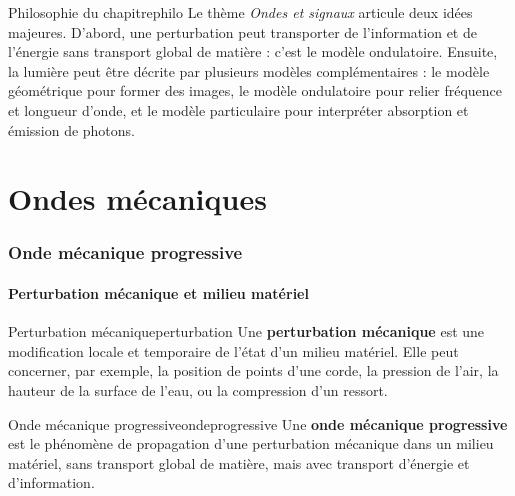 \documentclass[11pt,a4paper]{article}
\begin{document}
\begin{remarquebox}{Philosophie du chapitre}{philo}
Le thème \emph{Ondes et signaux} articule deux idées majeures. D'abord, une perturbation peut transporter de l'information et de l'énergie sans transport global de matière : c'est le modèle ondulatoire. Ensuite, la lumière peut être décrite par plusieurs modèles complémentaires : le modèle géométrique pour former des images, le modèle ondulatoire pour relier fréquence et longueur d'onde, et le modèle particulaire pour interpréter absorption et émission de photons.
\end{remarquebox}

\newpage

\part{Ondes mécaniques}

\section{Onde mécanique progressive}

\subsection{Perturbation mécanique et milieu matériel}

\begin{definitionbox}{Perturbation mécanique}{perturbation}
Une \textbf{perturbation mécanique} est une modification locale et temporaire de l'état d'un milieu matériel. Elle peut concerner, par exemple, la position de points d'une corde, la pression de l'air, la hauteur de la surface de l'eau, ou la compression d'un ressort.
\end{definitionbox}

\begin{definitionbox}{Onde mécanique progressive}{ondeprogressive}
Une \textbf{onde mécanique progressive} est le phénomène de propagation d'une perturbation mécanique dans un milieu matériel, sans transport global de matière, mais avec transport d'énergie et d'information.
\end{definitionbox}
\end{document}
